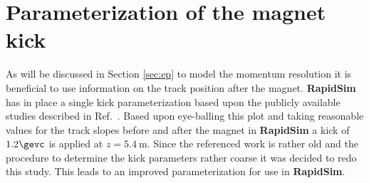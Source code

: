 \section{Parameterization of the magnet kick}
\label{sec:kick}
As will be discussed in Section \ref{sec:ep} to model the momentum
resolution it is beneficial to use information on the track position after the magnet. \textbf{RapidSim}
has in place a single kick parameterization based upon the publicly
available studies described in
Ref.~\cite{VanTilburg:691686}. Based upon eye-balling this plot and taking
reasonable values for the track slopes before and after the magnet in
\textbf{RapidSim} a kick of $1.2 \gevc$ is applied at $z = 5.4 ~\textrm{m}$.  Since the referenced work
is rather old and the procedure to determine the kick parameters
rather coarse it was decided to redo this study. This leads to an
improved parameterization for use in \textbf{RapidSim}.

